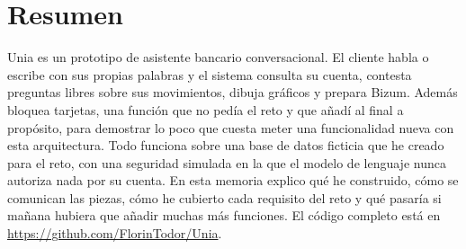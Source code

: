 \section*{Resumen}

Unia es un prototipo de asistente bancario conversacional. El cliente habla o escribe con sus propias palabras y el
sistema consulta su cuenta, contesta preguntas libres sobre sus movimientos, dibuja gráficos y prepara Bizum. Además
bloquea tarjetas, una función que no pedía el reto y que añadí al final a propósito, para demostrar lo poco que cuesta
meter una funcionalidad nueva con esta arquitectura. Todo funciona sobre una base de datos ficticia que he creado para el reto, con una seguridad simulada en la
que el modelo de lenguaje nunca autoriza nada por su cuenta. En esta memoria explico qué he construido, cómo se
comunican las piezas, cómo he cubierto cada requisito del reto y qué pasaría si mañana hubiera que añadir muchas más
funciones. El código completo está en \url{https://github.com/FlorinTodor/Unia}.
